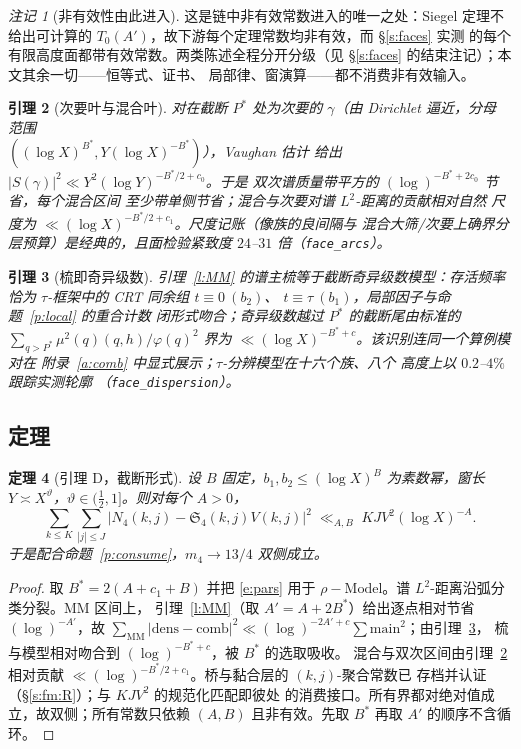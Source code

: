 \documentclass[11pt]{article}
\numberwithin{equation}{section}
\newtheorem{theorem}{定理}[section]
\newtheorem{lemma}[theorem]{引理}
\theoremstyle{definition}
\theoremstyle{remark}
\newtheorem{remark}[theorem]{注记}
\newcommand{\SSS}{\mathfrak{S}}
\begin{document}
\begin{remark}[非有效性由此进入]\label{r:ineffective}
这是链中非有效常数进入的唯一之处：Siegel 定理不给出可计算的
$T_0(A')$，故下游每个定理常数均非有效，而 \S\ref{s:faces} 实测
的每个有限高度面都带有效常数。两类陈述全程分开分级（见
\S\ref{s:faces} 的结束注记）；本文其余一切——恒等式、证书、
局部律、窗演算——都不消费非有效输入。
\end{remark}

\begin{lemma}[次要叶与混合叶]\label{l:minor}
对在截断 $P^{*}$ 处为次要的 $\gamma$（由 Dirichlet 逼近，分母
范围 \\ $((\log X)^{B^{*}},Y(\log X)^{-B^{*}})$），Vaughan 估计
给出 $|S(\gamma)|^{2}\ll Y^{2}(\log Y)^{-B^{*}/2+c_0}$。于是
双次谱质量带平方的 $(\log)^{-B^{*}+2c_0}$ 节省，每个混合区间
至少带单侧节省；混合与次要对谱 $L^{2}$-距离的贡献相对自然
尺度为 $\ll(\log X)^{-B^{*}/2+c_1}$。尺度记账（像族的良间隔与
混合大筛/次要上确界分层预算）是经典的，且面检验紧致度
$24$--$31$ 倍（\texttt{face\_arcs}）。
\end{lemma}

\begin{lemma}[梳即奇异级数]\label{l:comb}
引理~\ref{l:MM} 的谱主梳等于截断奇异级数模型：存活频率恰为
$\tau$-框架中的 CRT 同余组 $t\equiv0\ (b_2)$、
$t\equiv\tau\ (b_1)$，局部因子与命题~\ref{p:local} 的重合计数
闭形式吻合；奇异级数越过 $P^{*}$ 的截断尾由标准的
$\sum_{q>P^{*}}\mu^{2}(q)(q,h)/\varphi(q)^{2}$ 界为
$\ll(\log X)^{-B^{*}+c}$。该识别连同一个算例模对在
附录~\ref{a:comb} 中显式展示；$\tau$-分辨模型在十六个族、八个
高度上以 $0.2$--$4\%$ 跟踪实测轮廓
（\texttt{face\_dispersion}）。
\end{lemma}

\subsection{定理}

\begin{theorem}[引理 D，截断形式]\label{t:D}
设 $B$ 固定，$b_1,b_2\le(\log X)^{B}$ 为素数幂，窗长
$Y\asymp X^{\vartheta}$，$\vartheta\in(\tfrac12,1]$。则对每个
$A>0$，
\[
\sum_{k\le K}\sum_{|j|\le J}
\bigl|N_4(k,j)-\SSS_4(k,j)V(k,j)\bigr|^{2}
\;\ll_{A,B}\;KJV^{2}(\log X)^{-A}.
\]
于是配合命题~\ref{p:consume}，$m_4\to13/4$ 双侧成立。
\end{theorem}

\begin{proof}
取 $B^{*}=2(A+c_1+B)$ 并把 \eqref{e:pars} 用于
$\rho-\mathrm{Model}$。谱 $L^{2}$-距离沿弧分类分裂。MM 区间上，
引理~\ref{l:MM}（取 $A'=A+2B^{*}$）给出逐点相对节省
$(\log)^{-A'}$，故
$\sum_{\mathrm{MM}}|\mathrm{dens}-\mathrm{comb}|^{2}
\ll(\log)^{-2A'+c}\sum\mathrm{main}^{2}$；由引理~\ref{l:comb}，
梳与模型相对吻合到 $(\log)^{-B^{*}+c}$，被 $B^{*}$ 的选取吸收。
混合与双次区间由引理~\ref{l:minor} 相对贡献
$\ll(\log)^{-B^{*}/2+c_1}$。桥与黏合层的 $(k,j)$-聚合常数已
存档并认证（\S\ref{s:fm:R}）；与 $KJV^{2}$ 的规范化匹配即彼处
的消费接口。所有界都对绝对值成立，故双侧；所有常数只依赖
$(A,B)$ 且非有效。先取 $B^{*}$ 再取 $A'$ 的顺序不含循环。
\end{proof}
\end{document}
